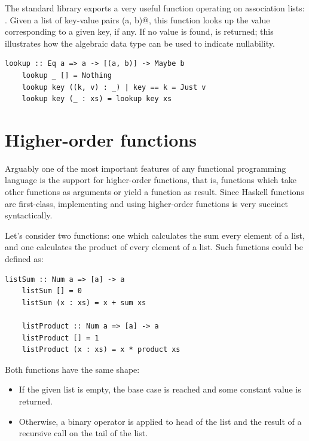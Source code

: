 \documentclass[UdineBachThesis,american,11pt]{PhdThesis}
\begin{document}
  The standard library exports a very useful function operating on association
  lists: \lstinline@lookup@. Given a list of key-value pairs \lstinline@(a, b)@,
  this function looks up the value corresponding to a given key, if any. If no
  value is found, \lstinline@Nothing@ is returned; this illustrates how the
  algebraic data type \lstinline@Maybe@ can be used to indicate nullability.

  \begin{lstlisting}[gobble=4,basicstyle=\ttfamily\small]
    lookup :: Eq a => a -> [(a, b)] -> Maybe b
    lookup _ [] = Nothing
    lookup key ((k, v) : _) | key == k = Just v
    lookup key (_ : xs) = lookup key xs
  \end{lstlisting}

  \section{Higher-order functions}

  Arguably one of the most important features of any functional programming
  language is the support for higher-order functions, that is, functions which
  take other functions as arguments or yield a function as result. Since Haskell
  functions are first-class, implementing and using higher-order functions is
  very succinct syntactically.

  Let's consider two functions: one which calculates the sum every element of a
  list, and one calculates the product of every element of a list. Such
  functions could be defined as:

  \pagebreak

  \begin{lstlisting}[gobble=4,basicstyle=\ttfamily\small]
    listSum :: Num a => [a] -> a
    listSum [] = 0
    listSum (x : xs) = x + sum xs

    listProduct :: Num a => [a] -> a
    listProduct [] = 1
    listProduct (x : xs) = x * product xs
  \end{lstlisting}

  Both functions have the same shape:

  \begin{itemize}
    \item If the given list is empty, the base case is reached and some constant
    value is returned.

    \item Otherwise, a binary operator is applied to head of the list and the
    result of a recursive call on the tail of the list.
  \end{itemize}
\end{document}
